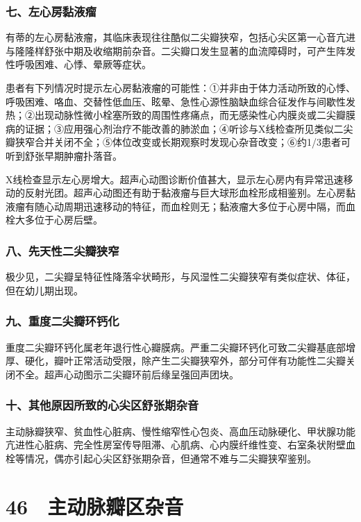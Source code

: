 \subsubsection{七、左心房黏液瘤}

有蒂的左心房黏液瘤，其临床表现往往酷似二尖瓣狭窄，包括心尖区第一心音亢进与隆隆样舒张中期及收缩期前杂音。二尖瓣口发生显著的血流障碍时，可产生阵发性呼吸困难、心悸、晕厥等症状。

患者有下列情况时提示左心房黏液瘤的可能性：①并非由于体力活动所致的心悸、呼吸困难、咯血、交替性低血压、眩晕、急性心源性脑缺血综合征发作与间歇性发热；②出现动脉性微小栓塞所致的周围性疼痛点，而无感染性心内膜炎或二尖瓣膜病的证据；③应用强心剂治疗不能改善的肺淤血；④听诊与X线检查所见类似二尖瓣狭窄合并关闭不全；⑤体位改变或长期观察时发现心杂音改变；⑥约1/3患者可听到舒张早期肿瘤扑落音。

X线检查显示左心房增大。超声心动图诊断价值甚大，显示左心房内有异常迅速移动的反射光团。超声心动图还有助于黏液瘤与巨大球形血栓形成相鉴别。左心房黏液瘤有随心动周期迅速移动的特征，而血栓则无；黏液瘤大多位于心房中隔，而血栓大多位于心房后壁。

\subsubsection{八、先天性二尖瓣狭窄}

极少见，二尖瓣呈特征性降落伞状畸形，与风湿性二尖瓣狭窄有类似症状、体征，但在幼儿期出现。

\subsubsection{九、重度二尖瓣环钙化}

重度二尖瓣环钙化属老年退行性心瓣膜病。严重二尖瓣环钙化可致二尖瓣基底部增厚、硬化，瓣叶正常活动受限，除产生二尖瓣狭窄外，部分可伴有功能性二尖瓣关闭不全。超声心动图示二尖瓣环前后缘呈强回声团块。

\subsubsection{十、其他原因所致的心尖区舒张期杂音}

主动脉瓣狭窄、贫血性心脏病、慢性缩窄性心包炎、高血压动脉硬化、甲状腺功能亢进性心脏病、完全性房室传导阻滞、心肌病、心内膜纤维性变、右室条状附壁血栓等情况，偶亦引起心尖区舒张期杂音，但通常不难与二尖瓣狭窄鉴别。

\protect\hypertarget{text00126.html}{}{}

\section{46　主动脉瓣区杂音}

